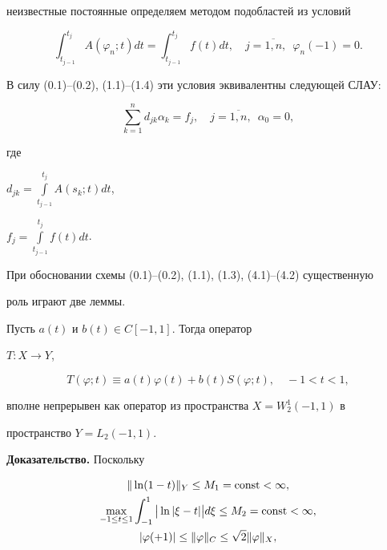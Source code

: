 неизвестные постоянные определяем методом подобластей из условий


\begin{equation}


\int_{t_{j-1}}^{t_j}A(\varphi_n;t)dt=\int_{t_{j-1}}^{t_j}f(t)dt, \quad


j=\overline{1, n}, \ \; \varphi_n(-1)=0. 


\end{equation}


В силу (0.1)--(0.2), (1.1)--(1.4) эти условия эквивалентны следующей СЛАУ:


\begin{equation}


\sum_{k=1}^nd_{jk}\alpha_k=f_j, \quad j=\overline{1, n}, \ \; \alpha_0=0, 


\end{equation}


где


$d_{jk}=\int\limits_{t_{j-1}}^{t_j}A(s_k;t)dt$,


$f_j=\int\limits_{t_{j-1}}^{t_j}f(t)dt$. 





При обосновании схемы (0.1)--(0.2), (1.1), (1.3), (4.1)--(4.2) существенную


роль играют две леммы. 





\begin{lem}


Пусть $a(t)$ и $b(t)\in C[-1, 1]$. Тогда оператор


$T:X\to Y$, 


$$


T(\varphi;t)\equiv a(t)\varphi(t)+b(t)S(\varphi;t), \quad -1<t<1, 


$$


вполне непрерывен как оператор из пространства $X=W_2^1(-1, 1)$ в


пространство $Y=L_2(-1, 1)$.


\end{lem}





{\bf Доказательство.} Поскольку


\begin{gather}


\|\ln(1-t)\|_Y\leq M_1=\const<\infty, \\


%


\max_{-1\leq t\leq 1}\int_{-1}^1\big|\ln|\xi-t|\big| d\xi\leq


M_2=\const<\infty, \\


%


|\varphi(+1)|\leq\|\varphi\|_C\leq\sqrt{2}\|\varphi\|_X, 


\end{gather}


